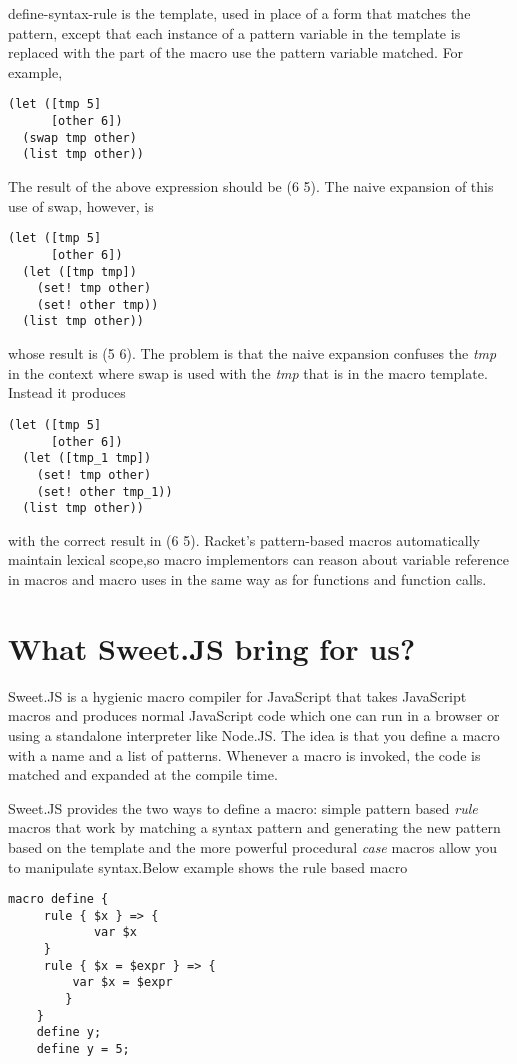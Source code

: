 \begin{enumerate}
define-syntax-rule is the template, used in place of a form that matches the pattern, except that each instance of a pattern variable in the template is replaced with the part of the macro use the pattern variable matched. For example, 

\begin{lstlisting}[frame=single]
(let ([tmp 5]
      [other 6])
  (swap tmp other)
  (list tmp other))
\end{lstlisting}  
The result of the above expression should be (6 5). The naive expansion of this use of swap, however, is
\begin{lstlisting}[frame=single]
(let ([tmp 5]
      [other 6])
  (let ([tmp tmp])
    (set! tmp other)
    (set! other tmp))
  (list tmp other))
\end{lstlisting} 
 whose result is (5 6). The problem is that the naive expansion confuses the \textit{tmp} in the context where swap is used with the \textit{tmp} that is in the macro template. Instead it produces
 \newpage
 \begin{lstlisting}[frame=single]
 (let ([tmp 5]
      [other 6])
  (let ([tmp_1 tmp])
    (set! tmp other)
    (set! other tmp_1))
  (list tmp other))
 \end{lstlisting}  
with the correct result in (6 5). Racket’s pattern-based macros automatically maintain lexical scope,so macro implementors can reason about variable reference in macros and macro uses in the same way as for functions and function calls.
\end{enumerate}

\section{What Sweet.JS bring for us?}

Sweet.JS is a hygienic macro compiler for JavaScript that takes JavaScript macros and produces normal JavaScript code which one can run in a browser or using a standalone interpreter like Node.JS. The idea is that you define a macro with a name and a list of patterns. Whenever a macro is invoked, the code is matched and expanded at the compile time.

Sweet.JS provides the two ways to define a macro: simple pattern based \textit{rule} macros that work by matching a syntax pattern and generating the new pattern based on the template and the more powerful procedural \textit{case} macros allow you to manipulate syntax.Below example shows the rule based macro
\newpage
\begin{lstlisting}[frame=single]
	macro define {
   	 rule { $x } => {
   		    var $x
   	 }
   	 rule { $x = $expr } => {
   	     var $x = $expr
    	}
	}
	define y;
	define y = 5;
\end{lstlisting}

